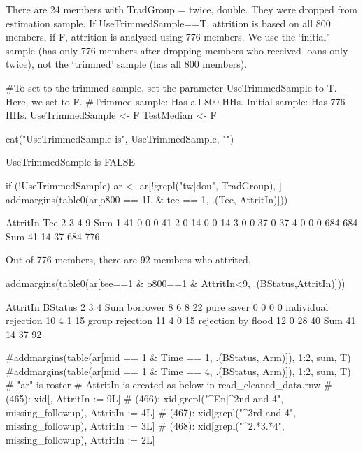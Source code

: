 There are 24 members with TradGroup = twice, double. They were dropped from estimation sample. If \textsf{UseTrimmedSample==T}, attrition is based on all 800 members, if \textsf{F}, attrition is analysed using 776 members. We use the `initial' sample (has only 776 members after dropping members who received loans only twice), not the `trimmed' sample (has all 800 members). \gobblepars
\begin{Schunk}
\begin{Sinput}
#To set to the trimmed sample, set the parameter \textsf{UseTrimmedSample} to T. Here, we set to F.
#Trimmed sample: Has all 800 HHs. Initial sample: Has 776 HHs.
UseTrimmedSample <- F
TestMedian <- F
\end{Sinput}
\end{Schunk}
\begin{Schunk}
\begin{Sinput}
cat("UseTrimmedSample is", UseTrimmedSample, "\n")
\end{Sinput}
\begin{Soutput}
UseTrimmedSample is FALSE 
\end{Soutput}
\begin{Sinput}
if (!UseTrimmedSample) 
  ar <- ar[!grepl("tw|dou", TradGroup), ]
addmargins(table0(ar[o800 == 1L & tee == 1, .(Tee, AttritIn)]))
\end{Sinput}
\begin{Soutput}
     AttritIn
Tee     2   3   4   9 Sum
  1    41   0   0   0  41
  2     0  14   0   0  14
  3     0   0  37   0  37
  4     0   0   0 684 684
  Sum  41  14  37 684 776
\end{Soutput}
\end{Schunk}
Out of 776 members, there are 92 members who attrited.
\begin{Schunk}
\begin{Sinput}
addmargins(table0(ar[tee==1 & o800==1 & AttritIn<9, .(BStatus,AttritIn)]))
\end{Sinput}
\begin{Soutput}
                      AttritIn
BStatus                 2  3  4 Sum
  borrower              8  6  8  22
  pure saver            0  0  0   0
  individual rejection 10  4  1  15
  group rejection      11  4  0  15
  rejection by flood   12  0 28  40
  Sum                  41 14 37  92
\end{Soutput}
\begin{Sinput}
#addmargins(table(ar[mid == 1 & Time == 1, .(BStatus, Arm)]), 1:2, sum, T)
#addmargins(table(ar[mid == 1 & Time == 4, .(BStatus, Arm)]), 1:2, sum, T)
# "ar" is roster
# AttritIn is created as below in read_cleaned_data.rnw
# (465): xid[, AttritIn := 9L]
# (466): xid[grepl("^En|^2nd and 4", missing_followup), AttritIn := 4L]
# (467): xid[grepl("^3rd and 4", missing_followup), AttritIn := 3L]
# (468): xid[grepl("^2.*3.*4", missing_followup), AttritIn := 2L]
\end{Sinput}
\end{Schunk}
